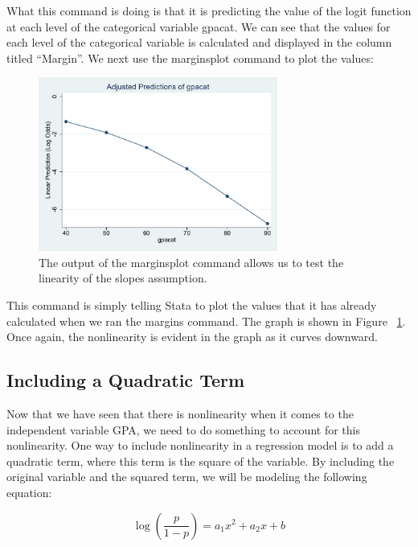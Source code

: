 \documentclass[a4paper,12pt,oneside]{book}
\begin{document}
\begin{stlog}\end{stlog}

What this command is doing is that it is predicting the value of the logit function at each level of the categorical variable gpacat. We can see that the values for each level of the categorical variable is 
calculated and displayed in the column titled “Margin”. We next use the marginsplot command to plot the values:

\begin{stlog}\end{stlog}
\begin{figure}[h]
    \centering
    \includegraphics[width=0.7\textwidth]{book_15.pdf}
    \caption{The output of the marginsplot command allows us to test the linearity of the slopes assumption.}
    \label{fig:marginslinearity}
\end{figure}

This command is simply telling Stata to plot the values that it has already calculated when we ran the margins command. The graph is shown in Figure ~\ref{fig:marginslinearity}. 
Once again, the nonlinearity is evident in the graph as it curves downward.
\subsection{Including a Quadratic Term}
Now that we have seen that there is nonlinearity when it comes to the independent variable GPA, we need to do something to account for this nonlinearity. One way to include nonlinearity in a 
regression model is to add a quadratic term, where this term is the square of the variable. By including the original variable and the squared term, we will be modeling the following equation:

$$ \log(\frac{p}{1-p})=a_1x^2+a_2x+b $$
\end{document}

